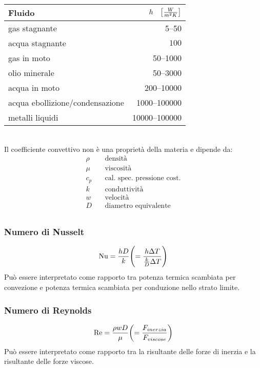 \begin{tabular}{p{5cm}r}
    \toprule
    Fluido & $h \quad \qty[\frac{W}{m^2K}]$ \\ \midrule
    gas stagnante &  \numrange{5}{50} \\
    acqua stagnante & $100$ \\
    gas in moto & \numrange{50}{1000} \\
    olio minerale & \numrange{50}{3000} \\
    acqua in moto & \numrange{200}{10000} \\
    acqua ebollizione/condensazione & \numrange{1000}{100000} \\
    metalli liquidi & \numrange{10000}{100000} \\
    \bottomrule
\end{tabular}\\

Il coefficiente convettivo non è una proprietà della materia e dipende da:
\begin{align*}
    \rho & \quad \text{densità} \\
    \mu & \quad \text{viscosità} \\
    c_p & \quad \text{cal. spec. pressione cost.} \\
    k & \quad \text{conduttività} \\
    w & \quad \text{velocità} \\
    D & \quad \text{diametro equivalente} \\
\end{align*}


\subsubsection{Numero di Nusselt}
\[ \operatorname{Nu} = \frac{h D}{k} \qty( = \frac{h \Delta T}{\frac{k}{D} \Delta T})\] 
Può essere interpretato come rapporto tra potenza termica scambiata per convezione e potenza termica scambiata per conduzione nello strato limite.

\subsubsection{Numero di Reynolds}
\[ \operatorname{Re} = \frac{\rho w D}{\mu} \qty( = \frac{F_{inerzia}}{F_{viscose}})\] 
Può essere interpretato come rapporto tra la risultante delle forze di inerzia e la risultante delle forze viscose.

